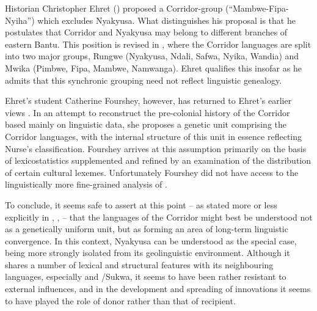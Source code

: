 Historian Christopher Ehret (\citeyear{EhretC1973}) proposed a Corridor-group (``Mambwe-Fi\-pa-Nyiha'') which excludes Nyakyusa. What distinguishes his proposal is that he postulates that Corridor and Nyakyusa may belong to different branches of eastern Bantu. This position is revised in \citet[36f, 55]{EhretC2001}, where the Corridor languages are split into two major groups, Rungwe (Nyakyusa, Ndali, Safwa, Nyika, Wandia) and Mwika (Pimbwe, Fipa, Mambwe, Namwanga). Ehret qualifies this insofar as he admits that this synchronic grouping need not reflect linguistic genealogy.

Ehret's student Catherine Fourshey, however, has returned to Ehret's earlier views \citep{FoursheyC2002}. In an attempt to reconstruct the pre-colonial history of the Corridor based mainly on linguistic data, she proposes a genetic unit comprising the Corridor languages, with the internal structure of this unit in essence reflecting Nurse's classification. Fourshey arrives at this assumption primarily on the basis of lexicostatistics supplemented and refined by an examination of the distribution of certain cultural lexemes. Unfortunately Fourshey did not have access to the linguistically more fine-grained analysis of \citet{LabroussiC1998}.

To conclude, it seems safe to assert at this point -- as stated more or less explicitly in \citet{NurseD1988}, \citet{LabroussiC1998}, \citet{NurseDPhillipsonG2003b} -- that the languages of the Corridor might best be understood not as a genetically uniform unit, but as forming an area of long-term linguistic convergence. In this context, Nyakyusa can be understood as the special case, being more strongly isolated from its geolinguistic environment. Although it shares a number of lexical and structural features with its neighbouring languages, especially  and /Sukwa, it seems to have been rather resistant to external influences, and in the development and spreading of innovations it seems to have played the role of donor rather than that of recipient.

\largerpage[-2]
